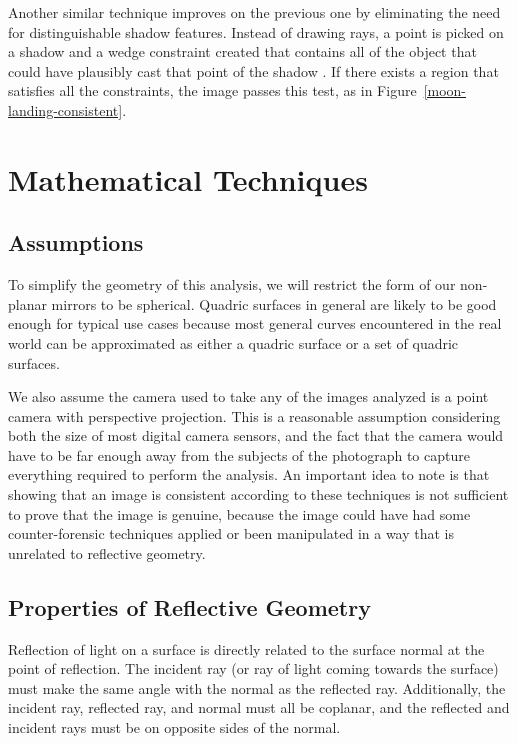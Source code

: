 \documentclass{thesis}
\begin{document}
Another similar technique improves on the previous one by eliminating the need for distinguishable shadow features. Instead of drawing rays, a point is picked on a shadow and a wedge constraint created that contains all of the object that could have plausibly cast that point of the shadow \cite{kee2013exposing}. If there exists a region that satisfies all the constraints, the image passes this test, as in Figure~\ref{moon-landing-consistent}.


\chapter{Mathematical Techniques}
\section{Assumptions}
To simplify the geometry of this analysis, we will restrict the form of our non-planar mirrors to be spherical. Quadric surfaces in general are likely to be good enough for typical use cases because most general curves encountered in the real world can be approximated as either a quadric surface or a set of quadric surfaces.

We also assume the camera used to take any of the images analyzed is a point camera with perspective projection. This is a reasonable assumption considering both the size of most digital camera sensors, and the fact that the camera would have to be far enough away from the subjects of the photograph to capture everything required to perform the analysis.
An important idea to note is that showing that an image is consistent according to these techniques is not sufficient to prove that the image is genuine, because the image could have had some counter-forensic techniques applied or been manipulated in a way that is unrelated to reflective geometry.

\section{Properties of Reflective Geometry}
Reflection of light on a surface is directly related to the surface normal at the point of reflection. The incident ray (or ray of light coming towards the surface) must make the same angle with the normal as the reflected ray.  Additionally, the incident ray, reflected ray, and normal must all be coplanar, and the reflected and incident rays must be on opposite sides of the normal.
\end{document}
